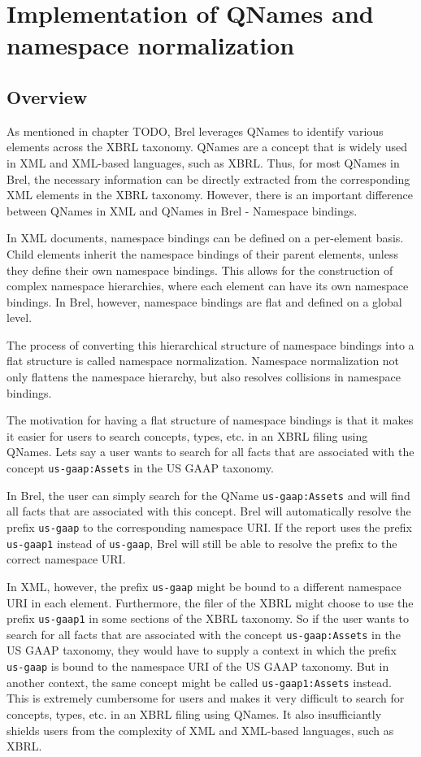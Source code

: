 
\section{Implementation of QNames and namespace normalization}

\subsection{Overview}

As mentioned in chapter TODO, Brel leverages QNames to identify various elements across the XBRL taxonomy. 
QNames are a concept that is widely used in XML and XML-based languages, such as XBRL.
Thus, for most QNames in Brel, the necessary information can be directly extracted from the corresponding XML elements in the XBRL taxonomy.
However, there is an important difference between QNames in XML and QNames in Brel - Namespace bindings.

In XML documents, namespace bindings can be defined on a per-element basis. 
Child elements inherit the namespace bindings of their parent elements, unless they define their own namespace bindings. 
This allows for the construction of complex namespace hierarchies, where each element can have its own namespace bindings.
In Brel, however, namespace bindings are flat and defined on a global level.

The process of converting this hierarchical structure of namespace bindings into a flat structure is called namespace normalization.
Namespace normalization not only flattens the namespace hierarchy, but also resolves collisions in namespace bindings.

The motivation for having a flat structure of namespace bindings is that it makes it easier for users to search concepts, types, etc. in an XBRL filing using QNames.
Lets say a user wants to search for all facts that are associated with the concept \texttt{us-gaap:Assets} in the US GAAP taxonomy.

In Brel, the user can simply search for the QName \texttt{us-gaap:Assets} and will find all facts that are associated with this concept.
Brel will automatically resolve the prefix \texttt{us-gaap} to the corresponding namespace URI.
If the report uses the prefix \texttt{us-gaap1} instead of \texttt{us-gaap}, Brel will still be able to resolve the prefix to the correct namespace URI.

In XML, however, the prefix \texttt{us-gaap} might be bound to a different namespace URI in each element. 
Furthermore, the filer of the XBRL might choose to use the prefix \texttt{us-gaap1} in some sections of the XBRL taxonomy.
So if the user wants to search for all facts that are associated with the concept \texttt{us-gaap:Assets} in the US GAAP taxonomy, 
they would have to supply a context in which the prefix \texttt{us-gaap} is bound to the namespace URI of the US GAAP taxonomy.
But in another context, the same concept might be called \texttt{us-gaap1:Assets} instead.
This is extremely cumbersome for users and makes it very difficult to search for concepts, types, etc. in an XBRL filing using QNames.
It also insufficiantly shields users from the complexity of XML and XML-based languages, such as XBRL.

